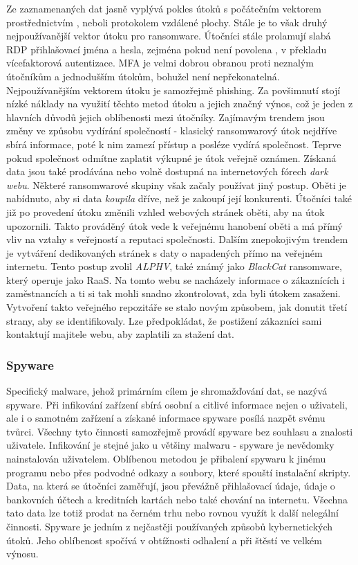 Ze zaznamenaných dat jasně vyplývá pokles útoků s počátečním vektorem prostřednictvím , neboli protokolem vzdálené plochy.
Stále je to však druhý nejpoužívanější vektor útoku pro ransomware.
Útočníci stále prolamují slabá \ac{RDP} přihlašovací jména a hesla, zejména pokud není povolena , v překladu vícefaktorová autentizace.
\ac{MFA} je velmi dobrou obranou proti neznalým útočníkům a jednodušším útokům, bohužel není nepřekonatelná.
Nejpoužívanějším vektorem útoku je samozřejmě phishing.
Za povšimnutí stojí nízké náklady na využití těchto metod útoku a jejich značný výnos, což je jeden z hlavních důvodů jejich oblíbenosti mezi útočníky.
Zajímavým trendem jsou změny ve způsobu vydírání společností - klasický ransomwarový útok nejdříve sbírá informace, poté k nim zamezí přístup a posléze vydírá společnost.
Teprve pokud společnost odmítne zaplatit výkupné je útok veřejně oznámen.
Získaná data jsou také prodávána nebo volně dostupná na internetových fórech \textit{dark webu}.
Některé ransomwarové skupiny však začaly používat jiný postup.
Oběti je nabídnuto, aby si data \textit{koupila} dříve, než je zakoupí její konkurenti.
Útočníci také již po provedení útoku změnili vzhled webových stránek oběti, aby na útok upozornili.
Takto prováděný útok vede k veřejnému hanobení oběti a má přímý vliv na vztahy s veřejností a reputaci společnosti.
Dalším znepokojivým trendem je vytváření dedikovaných stránek s daty o napadených přímo na veřejném internetu.
Tento postup zvolil \textit{ALPHV}, také známý jako \textit{BlackCat} ransomware, který operuje jako \ac{RaaS}\cite{ALPHV_blackcat}.
Na tomto webu se nacházely informace o zákaznících i zaměstnancích a ti si tak mohli snadno zkontrolovat, zda byli útokem zasaženi.
Vytvoření takto veřejného repozitáře se stalo novým způsobem, jak donutit třetí strany, aby se identifikovaly.
Lze předpokládat, že postižení zákazníci sami kontaktují majitele webu, aby zaplatili za stažení dat.

\subsubsection{Spyware}
Specifický malware, jehož primárním cílem je shromažďování dat, se nazývá spyware.
Při infikování zařízení sbírá osobní a citlivé informace nejen o uživateli, ale i o samotném zařízení a získané informace spyware posílá nazpět svému tvůrci.
Všechny tyto činnosti samozřejmě provádí spyware bez souhlasu a znalosti uživatele.
Infikování je stejné jako u většiny malwaru - spyware je nevědomky nainstalován uživatelem.
Oblíbenou metodou je přibalení spywaru k jinému programu nebo přes podvodné odkazy a soubory, které spouští instalační skripty.
Data, na která se útočníci zaměřují, jsou převážně přihlašovací údaje, údaje o bankovních účtech a kreditních kartách nebo také chování na internetu.
Všechna tato data lze totiž prodat na černém trhu nebo rovnou využít k další nelegální činnosti.
Spyware je jedním z nejčastěji používaných způsobů kybernetických útoků.
Jeho oblíbenost spočívá v obtížnosti odhalení a při štěstí ve velkém výnosu.\cite{avast_spyware, fortinet_spyware}

